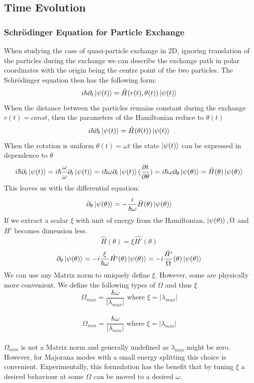 \documentclass[Master]{subfiles}
\begin{document}
\subsection{Time Evolution}
\subsubsection{Schrödinger Equation for Particle Exchange}\label{Equivalence}
When studying the case of quasi-particle exchange in 2D, ignoring translation of the particles during the exchange we can describe the exchange path in polar coordinates with the origin being the centre point of the two particles. The Schrödinger equation then has the following form:
$$ i \hbar \partial_t \ket{\psi(t)} = \hat{H}(r(t),\theta(t))\ket{\psi(t)}$$
When the distance between the particles remains constant during the exchange $r(t) = const$, then the parameters of the Hamiltonian reduce to $\theta(t)$
$$ i \hbar \partial_t \ket{\psi(t)} = \hat{H}(\theta(t))\ket{\psi(t)}$$
When the rotation is uniform $\theta(t) = \omega t$  the state $\ket{\psi(t)}$ can be expressed in dependence to $\theta$
$$ i \hbar \partial_t \ket{\psi(t)} = i \hbar \frac{\omega}{\omega}\partial_t \ket{\psi(t)} = i \hbar \omega \partial_{t} \ket{\psi(t)}(\frac{\partial t}{\partial \theta})   = i \hbar \omega \partial_{\theta} \ket{\psi(\theta)} = \hat{H}(\theta)\ket{\psi(\theta)}$$
This leaves us with the differential equation:
\begin{dmath}\label{Eq:SETheta}
\partial_{\theta} \ket{\psi(\theta)} = -\frac{  i }{\hbar \omega}\hat{H}(\theta)\ket{\psi(\theta)} 
\end{dmath}
If we extract a scalar $\xi$ with unit of energy from the Hamiltonian, $\ket{\psi(\theta)}, \Omega$ and $\hat{H'}$ becomes dimension less.
$$\hat{H}(\theta)  = \xi \hat{H'}(\theta)$$
$$\partial_{\theta} \ket{\psi(\theta)} = - i \frac{\xi}{\hbar \omega}\hat{H'}(\theta)\ket{\psi(\theta)} = - i \frac{ \hat{H'}}{\Omega}(\theta)\ket{\psi(\theta)} $$
We can use any Matrix norm to uniquely define $\xi$. However, some are physically more convenient.  
We define the following types of $\Omega$ and thus $\xi$\\
$$\Omega_{max} = \frac{\hbar \omega}{|\lambda_{max}|} \text{ where } \xi = |\lambda_{max}|$$\\
 $$\Omega_{min} = \frac{\hbar \omega}{|\lambda_{min}|} \text{ where } \xi = |\lambda_{min}| $$ \\
$\Omega_{min}$ is not a Matrix norm and generally undefined as $\lambda_{min}$ might be zero. 
However, for Majorana modes with a small energy splitting this choice is convenient.
Experimentally, this formulation has the benefit that by tuning $\xi$ a desired behaviour at some $\Omega$ can be moved to a desired $\omega$.\\
\end{document}
